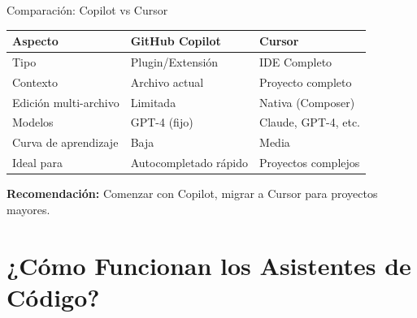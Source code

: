 \documentclass[aspectratio=169]{beamer}
\begin{document}
\begin{frame}{Comparación: Copilot vs Cursor}
    \begin{table}[]
        \centering
        \renewcommand{\arraystretch}{1.4}
        \begin{tabular}{p{4cm} p{4.5cm} p{4.5cm}}
            \toprule
            \textbf{Aspecto} & \textbf{GitHub Copilot} & \textbf{Cursor} \\
            \midrule
            Tipo & Plugin/Extensión & IDE Completo \\
            Contexto & Archivo actual & Proyecto completo \\
            Edición multi-archivo & Limitada & Nativa (Composer) \\
            Modelos & GPT-4 (fijo) & Claude, GPT-4, etc. \\
            Curva de aprendizaje & Baja & Media \\
            Ideal para & Autocompletado rápido & Proyectos complejos \\
            \bottomrule
        \end{tabular}
    \end{table}
    
    \vspace{0.3cm}
    \centering
    \textbf{Recomendación:} Comenzar con Copilot, migrar a Cursor para proyectos mayores.
\end{frame}

\section{¿Cómo Funcionan los Asistentes de Código?}
\end{document}
